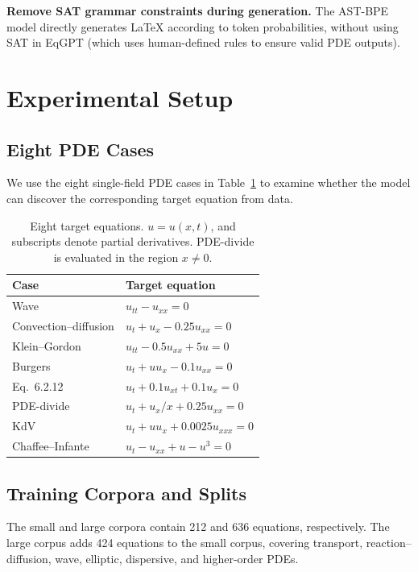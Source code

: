 \documentclass[11pt,letterpaper]{article}
\begin{document}
\begin{samepage}
\textbf{Remove SAT grammar constraints during generation.} The AST-BPE model directly generates LaTeX according to token probabilities, without using SAT in EqGPT (which uses human-defined rules to ensure valid PDE outputs).
\end{samepage}

\section{Experimental Setup}
\subsection{Eight PDE Cases}
We use the eight single-field PDE cases in Table~\ref{tab:cases} to examine whether the model can discover the corresponding target equation from data.

\begin{table}[!htbp]
\caption{Eight target equations. $u=u(x,t)$, and subscripts denote partial derivatives. PDE-divide is evaluated in the region $x\ne0$.}\label{tab:cases}
\centering\small
\begin{tabular*}{\linewidth}{@{\extracolsep{\fill}}ll@{}}\toprule
Case & Target equation\\\midrule
Wave & $u_{tt}-u_{xx}=0$\\
Convection--diffusion & $u_t+u_x-0.25u_{xx}=0$\\
Klein--Gordon & $u_{tt}-0.5u_{xx}+5u=0$\\
Burgers & $u_t+uu_x-0.1u_{xx}=0$\\
Eq.\ 6.2.12 & $u_t+0.1u_{xt}+0.1u_x=0$\\
PDE-divide & $u_t+u_x/x+0.25u_{xx}=0$\\
KdV & $u_t+uu_x+0.0025u_{xxx}=0$\\
Chaffee--Infante & $u_t-u_{xx}+u-u^3=0$\\\bottomrule
\end{tabular*}
\end{table}

\subsection{Training Corpora and Splits}
The small and large corpora contain 212 and 636 equations, respectively. The large corpus adds 424 equations to the small corpus, covering transport, reaction--diffusion, wave, elliptic, dispersive, and higher-order PDEs.
\end{document}
